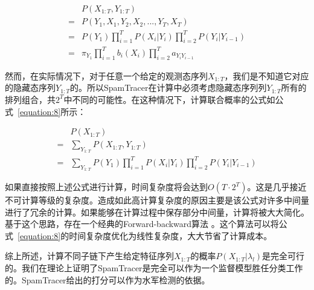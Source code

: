 \begin{equation}
\label{equation:7}
\begin{aligned}
& P(X_{1:T}, Y_{1:T})\\
= & P(Y_1, X_1, Y_2, X_2,...,Y_T, X_T)\\
= & P(Y_1)\prod_{i=1}^{T}{P(X_i|Y_i)}\prod_{i=2}^{T}{P(Y_i|Y_{i-1})}\\
= & \pi_{Y_1}\prod_{i=1}^{T}{b_i(X_i)}\prod_{i=2}^{T}{a_{Y_i Y_{i-1}}}
\end{aligned}
\end{equation}


然而，在实际情况下，对于任意一个给定的观测态序列$X_{1:T}$，我们是不知道它对应的隐藏态序列$Y_{1:T}$的。所以SpamTracer在计算中必须考虑隐藏态序列列$Y_{1:T}$所有的排列组合，共$2^T$中不同的可能性。在这种情况下，计算联合概率的公式如公式~\eqref{equation:8}所示：

\begin{equation}
\label{equation:8}
\begin{aligned}
& P(X_{1:T})\\
= & \sum_{Y_{1:T}} P(X_{1:T}, Y_{1:T})\\
= & \sum_{Y_{1:T}} P(Y_1)\prod_{i=1}^{T}{P(X_i|Y_i)}\prod_{i=2}^{T}{P(Y_i|Y_{i-1})}
\end{aligned}
\end{equation}

如果直接按照上述公式进行计算，时间复杂度将会达到$O(T\cdot2^T)$。这是几乎接近不可计算等级的复杂度。造成如此高计算复杂度的原因主要是该公式对许多中间量进行了冗余的计算。如果能够在计算过程中保存部分中间量，计算将被大大简化。基于这个思路，存在一个经典的Forward-backward算法 \cite{Rabiner:1989}。这个算法可以将公式~\eqref{equation:8}的时间复杂度优化为线性复杂度，大大节省了计算成本。

综上所述，计算不同子链下产生给定特征序列$X_{1:T}$的概率$P(X_{1:T} | \lambda_l)$是完全可行的。我们在理论上证明了SpamTracer是完全可以作为一个监督模型胜任分类工作的。SpamTracer给出的打分可以作为水军检测的依据。


